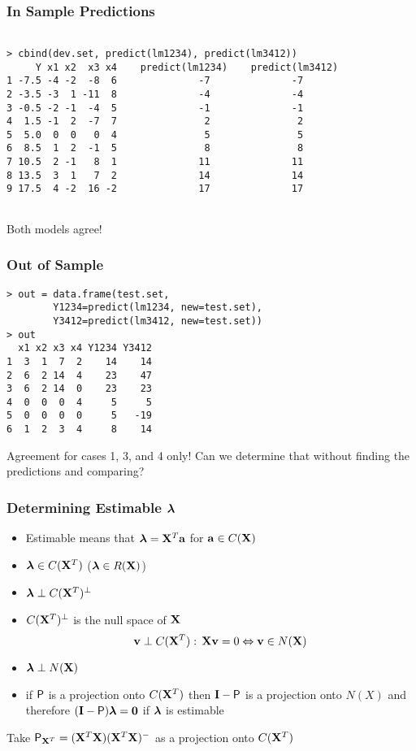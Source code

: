\documentclass[handout]{beamer}
\begin{document}
\begin{frame}[fragile] \frametitle{In Sample Predictions}

\begin{verbatim}

> cbind(dev.set, predict(lm1234), predict(lm3412))
     Y x1 x2  x3 x4    predict(lm1234)    predict(lm3412)
1 -7.5 -4 -2  -8  6              -7              -7
2 -3.5 -3  1 -11  8              -4              -4
3 -0.5 -2 -1  -4  5              -1              -1
4  1.5 -1  2  -7  7               2               2
5  5.0  0  0   0  4               5               5
6  8.5  1  2  -1  5               8               8
7 10.5  2 -1   8  1              11              11
8 13.5  3  1   7  2              14              14
9 17.5  4 -2  16 -2              17              17
 
\end{verbatim}  
Both models agree!
\end{frame}
\begin{frame} [fragile] \frametitle{Out of Sample}
\begin{verbatim}
> out = data.frame(test.set,
        Y1234=predict(lm1234, new=test.set), 
        Y3412=predict(lm3412, new=test.set))
> out
  x1 x2 x3 x4 Y1234 Y3412
1  3  1  7  2    14    14
2  6  2 14  4    23    47
3  6  2 14  0    23    23
4  0  0  0  4     5     5
5  0  0  0  0     5   -19
6  1  2  3  4     8    14
\end{verbatim}  \pause
Agreement for cases 1, 3, and 4 only!  Can we determine that without
finding the predictions and comparing?
\end{frame}

\begin{frame} \frametitle{Determining Estimable $\lambdab$}
  \begin{itemize}
 
 \item Estimable means that $\lambdab = \X^T \a$  for $\a \in C(\X)$ \pause
 \item $\lambdab \in C(\X^T)$ ($\lambdab \in R(\X)$)\pause
 \item $\lambdab \perp C(\X^T)^{\perp}$ \pause
 \item $C(\X^T)^{\perp}$ is the null space of $\X$  \pause
$$ \v \perp C(\X^T): \, \X \v = 0 \Leftrightarrow \v \in N(\X)$$ \pause
\item $\lambdab \perp  N(\X)$ \pause
\item if $\P$ is a projection onto $C(\X^T)$ then $\I - \P$ is a projection
  onto $N(X)$ and therefore $(\I - \P) \lambdab = \zero$ if $\lambdab$
  is estimable \pause
  \end{itemize}
\vfill
Take $\P_{\X^T} = (\X^T\X)(\X^T\X)^{-}$ as a projection onto $C(\X^T)$
\end{frame}
\end{document}
